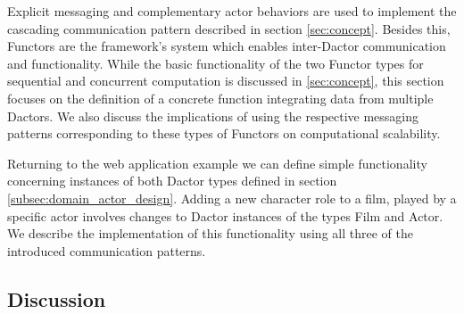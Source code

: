 Explicit messaging and complementary actor behaviors are used to implement the cascading communication pattern described in section \ref{sec:concept}.
Besides this, Functors are the framework's system which enables inter-Dactor communication and functionality.
While the basic functionality of the two Functor types for sequential and concurrent computation is discussed in \ref{sec:concept}, this section focuses on the definition of a concrete function integrating data from multiple Dactors.
We also discuss the implications of using the respective messaging patterns corresponding to these types of Functors on computational scalability.

Returning to the web application example we can define simple functionality concerning instances of both Dactor types defined in section \ref{subsec:domain_actor_design}.
Adding a new character role to a film, played by a specific actor involves changes to Dactor instances of the types Film and Actor.
We describe the implementation of this functionality using all three of the introduced communication patterns.


\subsection{Discussion}\label{subsec:discussion}
